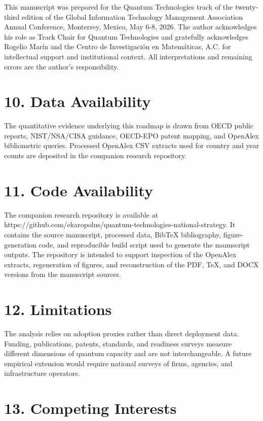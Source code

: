 \documentclass[
  11pt,
  letterpaper,
]{article}
\begin{document}
This manuscript was prepared for the Quantum Technologies track of the
twenty-third edition of the Global Information Technology Management
Association Annual Conference, Monterrey, Mexico, May 6-8, 2026. The
author acknowledges his role as Track Chair for Quantum Technologies and
gratefully acknowledges Rogelio Marín and the Centro de Investigación en
Matemáticas, A.C. for intellectual support and institutional context.
All interpretations and remaining errors are the author's
responsibility.

\section{10. Data Availability}\label{data-availability}

The quantitative evidence underlying this roadmap is drawn from OECD
public reports, NIST/NSA/CISA guidance, OECD-EPO patent mapping, and
OpenAlex bibliometric queries. Processed OpenAlex CSV extracts used for
country and year counts are deposited in the companion research
repository.

\section{11. Code Availability}\label{code-availability}

The companion research repository is available at
https://github.com/ekaropolus/quantum-technologies-national-strategy. It
contains the source manuscript, processed data, BibTeX bibliography,
figure-generation code, and reproducible build script used to generate
the manuscript outputs. The repository is intended to support inspection
of the OpenAlex extracts, regeneration of figures, and reconstruction of
the PDF, TeX, and DOCX versions from the manuscript sources.

\section{12. Limitations}\label{limitations}

The analysis relies on adoption proxies rather than direct deployment
data. Funding, publications, patents, standards, and readiness surveys
measure different dimensions of quantum capacity and are not
interchangeable. A future empirical extension would require national
surveys of firms, agencies, and infrastructure operators.

\section{13. Competing Interests}\label{competing-interests}
\end{document}
